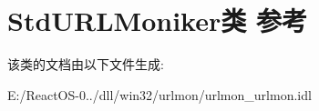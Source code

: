 \hypertarget{class_std_u_r_l_moniker}{}\section{Std\+U\+R\+L\+Moniker类 参考}
\label{class_std_u_r_l_moniker}


该类的文档由以下文件生成\+:\begin{DoxyCompactItemize}
\item 
E\+:/\+React\+O\+S-\/0../dll/win32/urlmon/urlmon\+\_\+urlmon.\+idl\end{DoxyCompactItemize}
